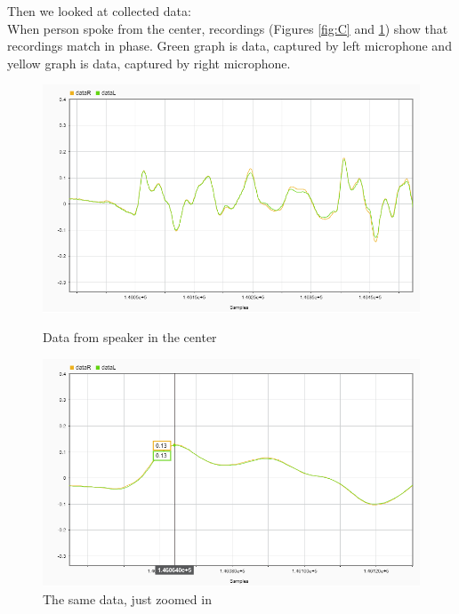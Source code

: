 Then we looked at collected data:\\
When person spoke from the center, recordings (Figures  \ref{fig:C} and \ref{fig:closeC}) show that 
recordings match in phase. Green graph is data, captured by left microphone and yellow graph is data, captured by right microphone. \\
\begin{figure}[htp]
\centering
\begin{minipage}{.55\textwidth}
  \centering
  \includegraphics[width=1\linewidth]{Illustrations/DataC.png}
  \caption{Data from speaker in the center}
  \label{fig:C}
\end{minipage}%
\begin{minipage}{.55\textwidth}
  \centering
  \includegraphics[width=1\linewidth]{Illustrations/DataC_with_Markers.png}
  \caption{The same data, just zoomed in}
  \label{fig:closeC}
\end{minipage}
\end{figure}

